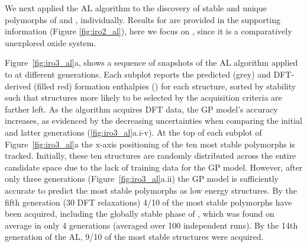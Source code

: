 %



%
We next applied the AL algorithm to the discovery of stable and unique polymorphs of \IrOtwo and \IrOthree, individually.
%
Results for \IrOtwo are provided in the supporting information (Figure \ref{fig:iro2_al}), here we focus on \IrOthree,
since it is a comparatively unexplored oxide system.

%


%
%
Figure~\ref{fig:iro3_al}a, shows a sequence of snapshots of the AL algorithm applied to \IrOthree at different generations.
%
Each subplot reports the predicted (grey) and DFT-derived (filled red) formation enthalpies (\DHf) for each structure, sorted by stability such that structures more likely to be selected by the acquisition criteria are farther left.
%
As the algorithm acquires DFT data, the GP model's accuracy increases,
as evidenced by the decreasing uncertainties when comparing the initial and latter generations (\ref{fig:iro3_al}a.i-v).
%
At the top of each subplot of Figure~\ref{fig:iro3_al}a the x-axis positioning of the ten most stable polymorphs is tracked.
%
Initially, these ten structures are randomly distributed across the entire candidate space due to the lack of training data for the GP model.
%
However, after only three generations (Figure~\ref{fig:iro3_al}a.ii) the GP model is sufficiently accurate to predict the most stable polymorphs as low energy structures.
%
By the fifth generation (\num{30} DFT relaxations) \num{4/10} of the most stable polymorphs have been acquired,
including the globally stable phase of \IrOthree, which
was found on average in only 4 generations (averaged over 100 independent runs).
%
By the 14th generation of the AL,
\num{9/10} of the most stable structures were acquired.


